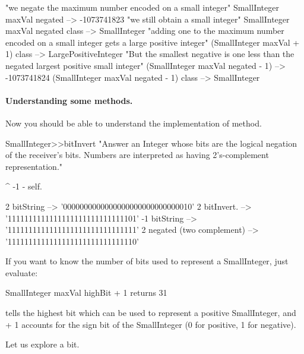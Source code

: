 \documentclass[a4paper,10pt,twoside]{book}
\begin{document}
\begin{code}{} 
"we negate the maximum number encoded on a small integer"
SmallInteger maxVal negated	 
	  	--> -1073741823
"we still obtain a small integer"		
SmallInteger maxVal negated class
		--> SmallInteger
"adding one to the maximum number encoded on a small integer gets a large positive integer"
(SmallInteger maxVal + 1) class
		--> LargePositiveInteger		
"But the smallest negative is one less than the negated largest positive small integer"		
(SmallInteger maxVal negated - 1) 
		--> -1073741824 
(SmallInteger maxVal negated - 1) class 
		--> SmallInteger 		 
\end{code}


\paragraph{Understanding some methods.}
Now you should be able to understand the implementation of  method.

\begin{code}{}
SmallInteger>>bitInvert
    "Answer an Integer whose bits are the logical negation of the receiver's bits.
    Numbers are interpreted as having 2's-complement representation."

	^ -1 - self.
\end{code}

\begin{code}{}
2 bitString
	--> '0000000000000000000000000000010'
2 bitInvert.
	--> '1111111111111111111111111111101'
-1 bitString
	--> '1111111111111111111111111111111'
2 negated (two complement)
	--> '1111111111111111111111111111110'
\end{code}




If you want to know the number of bits used to represent a
SmallInteger, just evaluate:

\begin{code}{}
SmallInteger maxVal highBit + 1
	returns 31
\end{code}

 tells the highest bit which can be used to
represent a positive SmallInteger, and + 1 accounts for the sign bit
of the SmallInteger (0 for positive, 1 for negative).


Let us explore a bit. 
\end{document}
